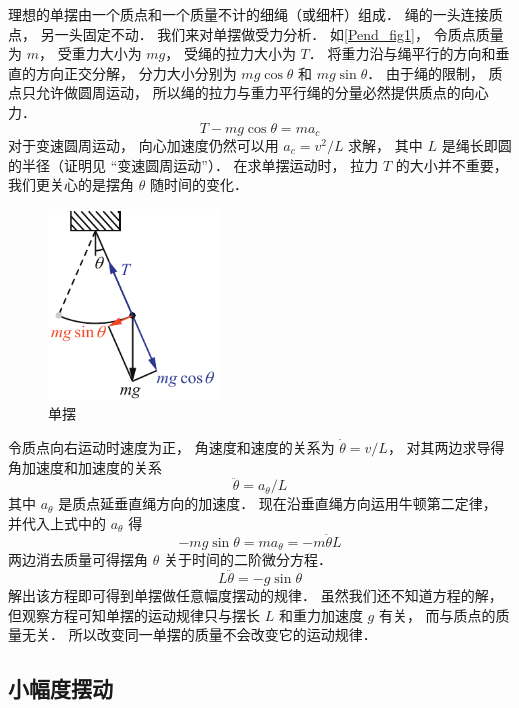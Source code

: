 
理想的单摆由一个质点和一个质量不计的细绳（或细杆）组成． 绳的一头连接质点， 另一头固定不动． 我们来对单摆做受力分析． 如\autoref{Pend_fig1}， 令质点质量为 $m$， 受重力大小为 $mg$， 受绳的拉力大小为 $T$． 将重力沿与绳平行的方向和垂直的方向正交分解， 分力大小分别为 $mg\cos\theta$ 和 $mg\sin\theta$． 由于绳的限制， 质点只允许做圆周运动， 所以绳的拉力与重力平行绳的分量必然提供质点的向心力．
\begin{equation}
T - mg\cos\theta = ma_c
\end{equation}
对于变速圆周运动， 向心加速度仍然可以用 $a_c = v^2/L$ 求解， 其中 $L$ 是绳长即圆的半径（证明见 “变速圆周运动”）．%
在求单摆运动时， 拉力 $T$ 的大小并不重要， 我们更关心的是摆角 $\theta$ 随时间的变化．
\begin{figure}[ht]
\centering
\includegraphics[width=4.5cm]{./figures/Pend.pdf}
\caption{单摆} \label{Pend_fig1}
\end{figure}

令质点向右运动时速度为正， 角速度和速度的关系为 $\dot\theta = v/L$， 对其两边求导得角加速度和加速度的关系
\begin{equation}
\ddot\theta = a_\theta/L
\end{equation}
其中 $a_\theta$ 是质点延垂直绳方向的加速度． 现在沿垂直绳方向运用牛顿第二定律， 并代入上式中的 $a_\theta$ 得
\begin{equation}
-mg\sin\theta = ma_\theta = -m\ddot\theta L
\end{equation}
两边消去质量可得摆角 $\theta$ 关于时间的二阶微分方程．
\begin{equation}\label{Pend_eq4}
L\ddot\theta = - g\sin\theta
\end{equation}
解出该方程即可得到单摆做任意幅度摆动的规律． 虽然我们还不知道方程的解， 但观察方程可知单摆的运动规律只与摆长 $L$ 和重力加速度 $g$ 有关， 而与质点的质量无关． 所以改变同一单摆的质量不会改变它的运动规律．

\subsection{小幅度摆动}

